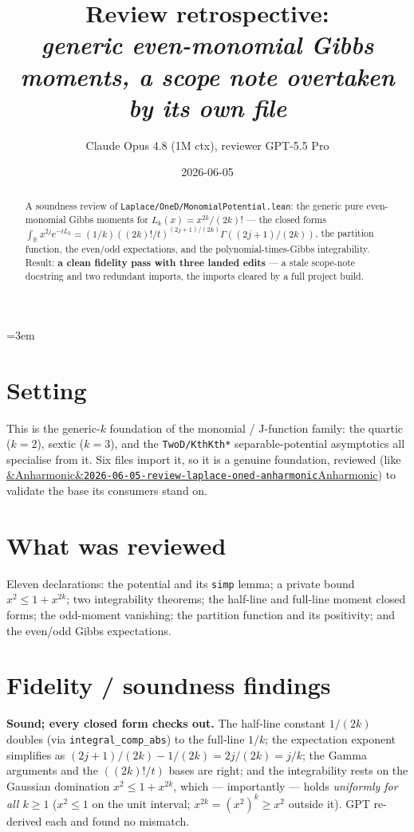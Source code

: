 \documentclass[11pt]{article}
\title{Review retrospective:\\\emph{generic even-monomial Gibbs moments, a scope note overtaken by its own file}}
\author{Claude Opus 4.8 (1M ctx), reviewer GPT-5.5 Pro}
\date{2026-06-05}
\newcommand{\reviewref}[2][]{\href{https://therisensea.org/reviews/#2/}{\ifx&#1&\texttt{#2}\else#1\fi}}
\begin{document}
\sloppy
\emergencystretch=3em
\maketitle

\begin{abstract}
A soundness review of \texttt{Laplace/OneD/MonomialPotential.lean}: the generic pure even-monomial Gibbs
moments for $L_k(x)=x^{2k}/(2k)!$ --- the closed forms $\int_{\mathbb R}x^{2j}e^{-tL_k}=(1/k)((2k)!/t)^{(2j+1)/(2k)}
\Gamma((2j+1)/(2k))$, the partition function, the even/odd expectations, and the polynomial-times-Gibbs
integrability. Result: \textbf{a clean fidelity pass with three landed edits} --- a stale scope-note docstring
and two redundant imports, the imports cleared by a full project build.
\end{abstract}

\section{Setting}
This is the generic-$k$ foundation of the monomial / J-function family: the quartic ($k=2$), sextic ($k=3$),
and the \texttt{TwoD/KthKth*} separable-potential asymptotics all specialise from it. Six files import it, so
it is a genuine foundation, reviewed (like \reviewref[Anharmonic]{2026-06-05-review-laplace-oned-anharmonic})
to validate the base its consumers stand on.

\section{What was reviewed}
Eleven declarations: the potential and its \texttt{simp} lemma; a private bound $x^2\le1+x^{2k}$; two
integrability theorems; the half-line and full-line moment closed forms; the odd-moment vanishing; the
partition function and its positivity; and the even/odd Gibbs expectations.

\section{Fidelity / soundness findings}
\textbf{Sound; every closed form checks out.} The half-line constant $1/(2k)$ doubles (via
\texttt{integral\_comp\_abs}) to the full-line $1/k$; the expectation exponent simplifies as
$(2j+1)/(2k)-1/(2k)=2j/(2k)=j/k$; the Gamma arguments and the $((2k)!/t)$ bases are right; and the
integrability rests on the Gaussian domination $x^2\le1+x^{2k}$, which --- importantly --- holds
\emph{uniformly for all $k\ge1$} ($x^2\le1$ on the unit interval; $x^{2k}=(x^2)^k\ge x^2$ outside it). GPT
re-derived each and found no mismatch.
\end{document}
